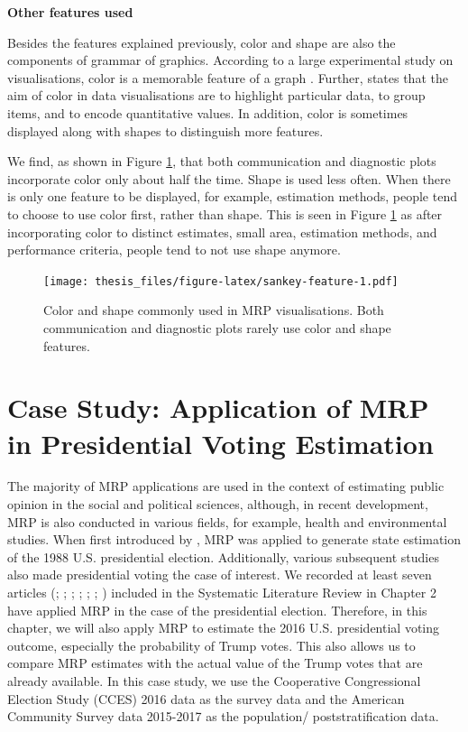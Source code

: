 \documentclass{monashthesis}
\begin{document}
\newpage

\textbf{Other features used}

Besides the features explained previously, color and shape are also the components of grammar of graphics. According to a large experimental study on visualisations, color is a memorable feature of a graph \autocite{MIDWAY2020100141}. Further, \textcite{few_2008} states that the aim of color in data visualisations are to highlight particular data, to group items, and to encode quantitative values. In addition, color is sometimes displayed along with shapes to distinguish more features.

We find, as shown in Figure \ref{fig:sankey-feature}, that both communication and diagnostic plots incorporate color only about half the time. Shape is used less often. When there is only one feature to be displayed, for example, estimation methods, people tend to choose to use color first, rather than shape. This is seen in Figure \ref{fig:sankey-feature} as after incorporating color to distinct estimates, small area, estimation methods, and performance criteria, people tend to not use shape anymore.

\begin{figure}
\centering
\texttt{[image: thesis\_files/figure-latex/sankey-feature-1.pdf]}
\caption{\label{fig:sankey-feature}Color and shape commonly used in MRP visualisations. Both communication and diagnostic plots rarely use color and shape features.}
\end{figure}

\hypertarget{ch:case-stud}{%
\chapter{Case Study: Application of MRP in Presidential Voting Estimation}\label{ch:case-stud}}

The majority of MRP applications are used in the context of estimating public opinion in the social and political sciences, although, in recent development, MRP is also conducted in various fields, for example, health and environmental studies. When first introduced by \textcite{Gelman97poststratificationinto}, MRP was applied to generate state estimation of the 1988 U.S. presidential election. Additionally, various subsequent studies also made presidential voting the case of interest. We recorded at least seven articles (\textcite{GelmanAndrew2014HBAC}; \textcite{GhitzaYair2013DIwM}; \textcite{KiewietdeJongeChadP2018PSPE}; \textcite{LauderdaleBenjaminE2020Mppf}; \textcite{LeiRayleigh2017T2EA}; \textcite{ParkDavidK2004BMEw}; \textcite{WangWei2015Fewn}) included in the Systematic Literature Review in Chapter 2 have applied MRP in the case of the presidential election. Therefore, in this chapter, we will also apply MRP to estimate the 2016 U.S. presidential voting outcome, especially the probability of Trump votes. This also allows us to compare MRP estimates with the actual value of the Trump votes that are already available. In this case study, we use the Cooperative Congressional Election Study (CCES) 2016 data \autocite{cces_data} as the survey data and the American Community Survey data 2015-2017 \autocite{acs_data} as the population/ poststratification data.
\end{document}
